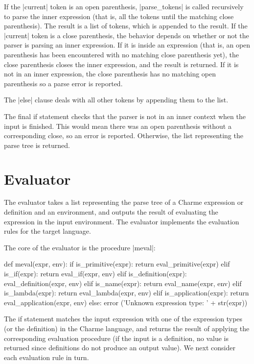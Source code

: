 If the \pycode|current| token is an open parenthesis, \pycode|parse_tokens| is called recursively to parse the inner expression (that is, all the tokens until the matching close parenthesis).  The result is a list of tokens, which is appended to the result.  If the \pycode|current| token is a close parenthesis, the behavior depends on whether or not the parser is parsing an inner expression.  If it is inside an expression (that is, an open parenthesis has been encountered with no matching close parenthesis yet), the close parenthesis closes the inner expression, and the result is returned.  If it is not in an inner expression, the close parenthesis has no matching open parenthesis so a parse error is reported.  

The \pycode|else| clause deals with all other tokens by appending them to the list.

The final if statement checks that the parser is not in an inner context when the input is finished.  This would mean there was an open parenthesis without a corresponding close, so an error is reported.  Otherwise, the list representing the parse tree is returned.

\section{Evaluator}\label{sec:evaluator}

The evaluator takes a list representing the parse tree of a Charme expression or definition and an environment, and outputs the result of evaluating the expression in the input environment.  The evaluator implements the evaluation rules for the target language.

The core of the evaluator is the procedure \pycode|meval|:

\begin{pythoncode}
def meval(expr, env):
    if is_primitive(expr): return eval_primitive(expr)
    elif is_if(expr): return eval_if(expr, env) 
    elif is_definition(expr): eval_definition(expr, env)
    elif is_name(expr): return eval_name(expr, env)
    elif is_lambda(expr): return eval_lambda(expr, env)
    elif is_application(expr): return eval_application(expr, env)
    else: error ('Unknown expression type: ' + str(expr))
\end{pythoncode}

The if statement matches the input expression with one of the expression types (or the definition) in the Charme language, and returns the result of applying the corresponding evaluation procedure (if the input is a definition, no value is returned since definitions do not produce an output value).  We next consider each evaluation rule in turn.

